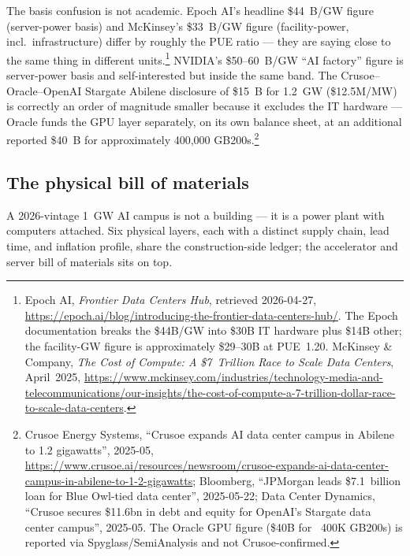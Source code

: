 The basis confusion is not academic. Epoch AI's headline \$44~B/GW figure (server-power basis) and McKinsey's \$33~B/GW figure (facility-power, incl.\ infrastructure) differ by roughly the PUE ratio --- they are saying close to the same thing in different units.\footnote{Epoch AI, \emph{Frontier Data Centers Hub}, retrieved 2026-04-27, \url{https://epoch.ai/blog/introducing-the-frontier-data-centers-hub/}. The Epoch documentation breaks the \$44B/GW into \$30B IT hardware plus \$14B other; the facility-GW figure is approximately \$29--30B at PUE~1.20. McKinsey \& Company, \emph{The Cost of Compute: A \$7~Trillion Race to Scale Data Centers}, April~2025, \url{https://www.mckinsey.com/industries/technology-media-and-telecommunications/our-insights/the-cost-of-compute-a-7-trillion-dollar-race-to-scale-data-centers}.} NVIDIA's \$50--60~B/GW ``AI factory'' figure is server-power basis and self-interested but inside the same band. The Crusoe--Oracle--OpenAI Stargate Abilene disclosure of \$15~B for 1.2~GW (\$12.5M/MW) is correctly an order of magnitude smaller because it excludes the IT hardware --- Oracle funds the GPU layer separately, on its own balance sheet, at an additional reported \$40~B for approximately 400{,}000 GB200s.\footnote{Crusoe Energy Systems, ``Crusoe expands AI data center campus in Abilene to 1.2 gigawatts'', 2025-05, \url{https://www.crusoe.ai/resources/newsroom/crusoe-expands-ai-data-center-campus-in-abilene-to-1-2-gigawatts}; Bloomberg, ``JPMorgan leads \$7.1~billion loan for Blue Owl-tied data center'', 2025-05-22; Data Center Dynamics, ``Crusoe secures \$11.6bn in debt and equity for OpenAI's Stargate data center campus'', 2025-05. The Oracle GPU figure (\$40B for ~400K GB200s) is reported via Spyglass/SemiAnalysis and not Crusoe-confirmed.}

\subsection{The physical bill of materials}
\label{subsec:physical-bom}

A 2026-vintage 1~GW AI campus is not a building --- it is a power plant with computers attached. Six physical layers, each with a distinct supply chain, lead time, and inflation profile, share the construction-side ledger; the accelerator and server bill of materials sits on top.

